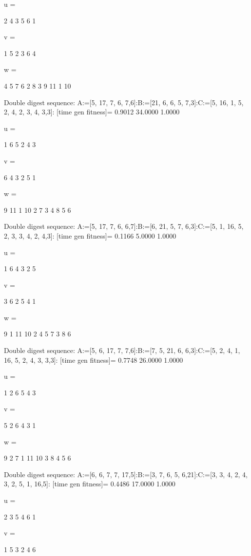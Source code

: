 u =

     2     4     3     5     6     1


v =

     1     5     2     3     6     4


w =

     4     5     7     6     2     8     3     9    11     1    10

Double digest sequence:
A:=[5, 17, 7, 6, 7,6]:B:=[21, 6, 6, 5, 7,3]:C:=[5, 16, 1, 5, 2, 4, 2, 3, 4, 3,3]:
[time gen fitness]=
    0.9012   34.0000    1.0000


u =

     1     6     5     2     4     3


v =

     6     4     3     2     5     1


w =

     9    11     1    10     2     7     3     4     8     5     6

Double digest sequence:
A:=[5, 17, 7, 6, 6,7]:B:=[6, 21, 5, 7, 6,3]:C:=[5, 1, 16, 5, 2, 3, 3, 4, 2, 4,3]:
[time gen fitness]=
    0.1166    5.0000    1.0000


u =

     1     6     4     3     2     5


v =

     3     6     2     5     4     1


w =

     9     1    11    10     2     4     5     7     3     8     6

Double digest sequence:
A:=[5, 6, 17, 7, 7,6]:B:=[7, 5, 21, 6, 6,3]:C:=[5, 2, 4, 1, 16, 5, 2, 4, 3, 3,3]:
[time gen fitness]=
    0.7748   26.0000    1.0000


u =

     1     2     6     5     4     3


v =

     5     2     6     4     3     1


w =

     9     2     7     1    11    10     3     8     4     5     6

Double digest sequence:
A:=[6, 6, 7, 7, 17,5]:B:=[3, 7, 6, 5, 6,21]:C:=[3, 3, 4, 2, 4, 3, 2, 5, 1, 16,5]:
[time gen fitness]=
    0.4486   17.0000    1.0000


u =

     2     3     5     4     6     1


v =

     1     5     3     2     4     6


